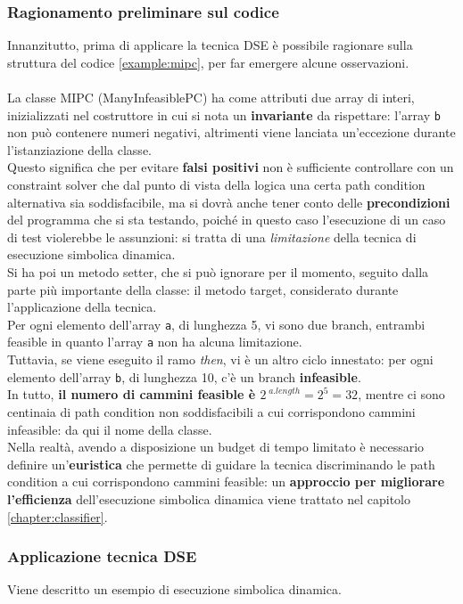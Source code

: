\documentclass[a4paper, 12pt, oneside]{book}
\theoremstyle{normal}
\begin{document}
\subsubsection{Ragionamento preliminare sul codice}
\noindent Innanzitutto, prima di applicare la tecnica DSE è possibile ragionare sulla struttura del codice \ref{example:mipc}, per far emergere alcune osservazioni.
\\ \\ La classe MIPC (ManyInfeasiblePC) ha come attributi due array di interi, inizializzati nel costruttore in cui si nota un \textbf{invariante} da rispettare: l'array \verb|b| non può contenere numeri negativi, altrimenti viene lanciata un'eccezione durante l'istanziazione della classe. \\ Questo significa che per evitare \textbf{falsi positivi} non è sufficiente controllare con un constraint solver che dal punto di vista della logica una certa path condition alternativa sia soddisfacibile, ma si dovrà anche tener conto delle \textbf{precondizioni} del programma che si sta testando, poiché in questo caso l'esecuzione di un caso di test violerebbe le assunzioni: si tratta di una \emph{limitazione} della tecnica di esecuzione simbolica dinamica.
\\ Si ha poi un metodo setter, che si può ignorare per il momento, seguito dalla parte più importante della classe: il metodo target, considerato durante l'applicazione della tecnica.
\\ Per ogni elemento dell'array \verb|a|, di lunghezza 5, vi sono due branch, entrambi feasible in quanto l'array \verb|a| non ha alcuna limitazione. \\ Tuttavia, se viene eseguito il ramo \textit{then}, vi è un altro ciclo innestato: per ogni elemento dell'array \verb|b|, di lunghezza 10, c'è un branch \textbf{infeasible}. \\ In tutto, \textbf{il numero di cammini feasible è $2^{\;a.length} = 2^5 = 32$}, mentre ci sono centinaia di path condition non soddisfacibili a cui corrispondono cammini infeasible: da qui il nome della classe. \\ Nella realtà, avendo a disposizione un budget di tempo limitato è necessario definire un'\textbf{euristica} che permette di guidare la tecnica discriminando le path condition a cui corrispondono cammini feasible: un \textbf{approccio per migliorare l'efficienza} dell'esecuzione simbolica dinamica viene trattato nel capitolo \ref{chapter:classifier}.
\subsubsection{Applicazione tecnica DSE}
Viene descritto un esempio di esecuzione simbolica dinamica.
\end{document}
